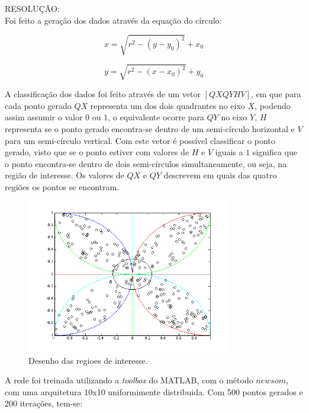 \documentclass[a4paper,oneside,12pt]{article}
\begin{document}
\begin{enumerate}[1.]
RESOLU\c{C}\~AO: \\

Foi feito a gera\c{c}\~ao dos dados atrav\'es da equa\c{c}\~ao do c\'irculo:

\begin{equation*}
x = \sqrt{r^{2} - (y - y_{0})^{2}} + x_{0}
\end{equation*}

\begin{equation*}
y = \sqrt{r^{2} - (x - x_{0})^{2}} + y_{0}
\end{equation*}

A classifica\c{c}\~ao dos dados foi feito atrav\'es de um vetor $[QX QY H V]$, em que para cada ponto gerado $QX$ representa um dos dois quadrantes no eixo $X$, podendo assim assumir o valor $0$ ou $1$, o equivalente ocorre para $QY$ no eixo $Y$, $H$ representa se o ponto gerado encontra-se dentro de um semi-c\'irculo horizontal e $V$ para um semi-c\'irculo vertical. Com este vetor \'e poss\'ivel classificar o ponto gerado, visto que se o ponto estiver com valores de $H$ e $V$ iguais a $1$ significa que o ponto encontra-se dentro de dois semi-c\'irculos simultaneamente, ou seja, na regi\~ao de interesse. Os valores de $QX$ e $QY$ descrevem em quais das quatro regi\~oes os pontos se encontram.

\begin{figure}
\centering
\includegraphics[width=0.8\textwidth]{q8_1.png}
\caption{Desenho das regioes de interesse.}
\label{fig:q8_1}
\end{figure}

A rede foi treinada utilizando a \emph{toolbox} do MATLAB, com o m\'etodo $newsom$, com uma arquitetura 10x10 uniformimente distribuida. Com 500 pontos gerados e 200 itera\c{c}\~oes, tem-se:


\end{enumerate}
\end{document}
